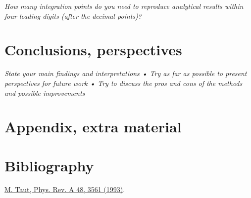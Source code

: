 \documentclass{article}
\begin{document}
		\textit{How many integration points do you need to reproduce analytical results
		within four leading digits (after the decimal points)?}


\section{Conclusions, perspectives}

\textit{State your main findings and interpretations
• Try as far as possible to present perspectives for future work
• Try to discuss the pros and cons of the methods and possible improvements}



\section{Appendix, extra material}

\section{Bibliography}
	\href{http://prola.aps.org/abstract/PRA/v48/i5/p3561_1}{M. Taut, Phys. Rev. A 48, 3561 (1993)}.
\end{document}

